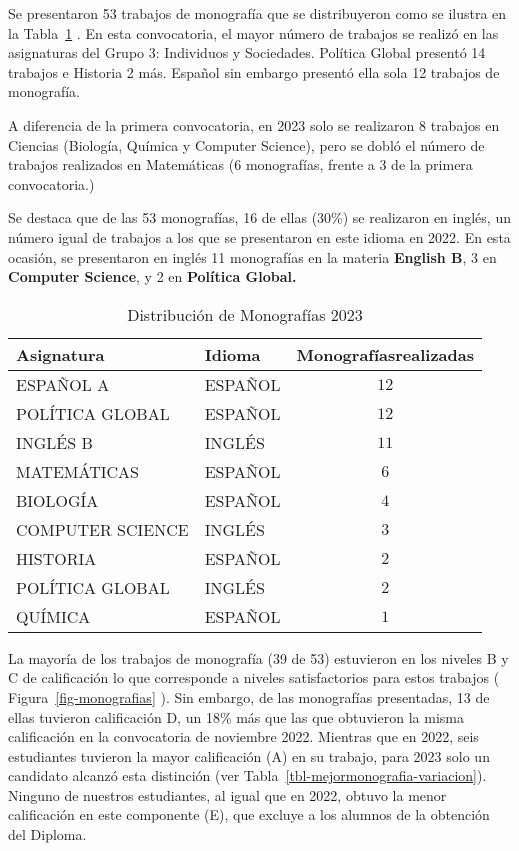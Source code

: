 \documentclass[
  letterpaper,
  DIV=11,
  numbers=noendperiod]{scrartcl}
\begin{document}
Se presentaron 53 trabajos de monografía que se distribuyeron como se
ilustra en la Tabla~\ref{tbl-monografia} . En esta convocatoria, el
mayor número de trabajos se realizó en las asignaturas del Grupo 3:
Individuos y Sociedades. Política Global presentó 14 trabajos e Historia
2 más. Español sin embargo presentó ella sola 12 trabajos de monografía.

A diferencia de la primera convocatoria, en 2023 solo se realizaron 8
trabajos en Ciencias (Biología, Química y Computer Science), pero se
dobló el número de trabajos realizados en Matemáticas (6 monografías,
frente a 3 de la primera convocatoria.)

Se destaca que de las 53 monografías, 16 de ellas (30\%) se realizaron
en inglés, un número igual de trabajos a los que se presentaron en este
idioma en 2022. En esta ocasión, se presentaron en inglés 11 monografías
en la materia \textbf{English B}, 3 en \textbf{Computer Science}, y 2 en
\textbf{Política Global.}

\hypertarget{tbl-monografia}{}
\begin{longtable}{llc}
\caption{\label{tbl-monografia}Distribución de Monografías 2023 }\tabularnewline

\toprule
Asignatura & Idioma & Monografíasrealizadas \\ 
\midrule
ESPAÑOL A & ESPAÑOL & $12$ \\ 
POLÍTICA GLOBAL & ESPAÑOL & $12$ \\ 
INGLÉS B & INGLÉS & $11$ \\ 
MATEMÁTICAS & ESPAÑOL & $6$ \\ 
BIOLOGÍA & ESPAÑOL & $4$ \\ 
COMPUTER SCIENCE & INGLÉS & $3$ \\ 
HISTORIA & ESPAÑOL & $2$ \\ 
POLÍTICA GLOBAL & INGLÉS & $2$ \\ 
QUÍMICA & ESPAÑOL & $1$ \\ 
\bottomrule
\end{longtable}

La mayoría de los trabajos de monografía (39 de 53) estuvieron en los
niveles B y C de calificación lo que corresponde a niveles
satisfactorios para estos trabajos ( Figura~\ref{fig-monografias} ). Sin
embargo, de las monografías presentadas, 13 de ellas tuvieron
calificación D, un 18\% más que las que obtuvieron la misma calificación
en la convocatoria de noviembre 2022. Mientras que en 2022, seis
estudiantes tuvieron la mayor calificación (A) en su trabajo, para 2023
solo un candidato alcanzó esta distinción (ver
Tabla~\ref{tbl-mejormonografia-variacion}). Ninguno de nuestros
estudiantes, al igual que en 2022, obtuvo la menor calificación en este
componente (E), que excluye a los alumnos de la obtención del Diploma.
\end{document}
